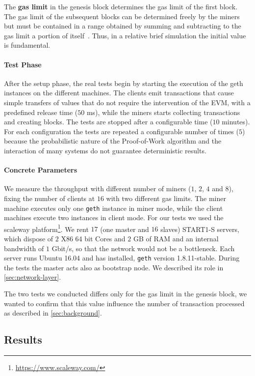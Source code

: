 The \textbf{gas limit} in the genesis block determines the gas limit of the
first block. The gas limit of the subsequent blocks can be determined freely by
the miners but must be contained in a range obtained by summing and subtracting
to the gas limit a portion of itself~\cite{wood2018ethereum}. Thus, in a
relative brief simulation the initial value is fundamental.

\paragraph{Test Phase}
After the setup phase, the real tests begin by starting the execution of the
geth instances on the different machines. The clients emit transactions that
cause simple transfers of values that do not require the intervention of the
EVM, with a predefined release time ($50$ ms), while the miners starts
collecting transactions and creating blocks. The tests are stopped after a
configurable time ($10$ minutes). For each configuration the tests are repeated
a configurable number of times ($5$) because the probabilistic nature of the
Proof-of-Work algorithm and the interaction of many systems do not guarantee
deterministic results.


\paragraph{Concrete Parameters}
We measure the throughput with different number of miners ($1$, $2$, $4$ and
$8$), fixing the number of clients at $16$ with two different gas limits.
The miner machine executes only one \texttt{geth} instance in miner mode, while
the client machines execute two instances in client mode. For our tests we used
the scaleway
platform\footnote{\url{https://www.scaleway.com/}}. We rent $17$ (one master
and $16$ slaves) START1-S servers, which dispose of $2$ X86 64 bit Cores and
$2$ GB of RAM and an internal bandwidth of $1$ Gbit/s, so that the network
would not be a bottleneck. Each server runs Ubuntu 16.04 and has installed,
\texttt{geth} version 1.8.11-stable. During the tests the master acts also as
bootstrap node. We described its role in \autoref{sec:network-layer}.

The two tests we conducted differs only for the gas limit in the genesis block,
we wanted to confirm that this value influence the number of transaction
processed as described in \autoref{sec:background}.


\subsection{Results}

